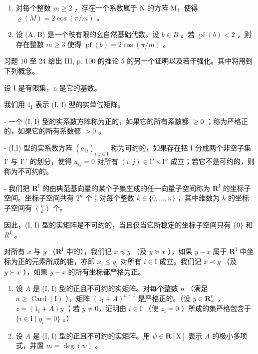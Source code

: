 \begin{enumerate}
\def\labelenumi{\alph{enumi})}
\setcounter{enumi}{1}
\item
  对每个整数 \(m \geqslant 2\) ，存在一个系数属于 N 的方阵 M，使得 \(\varrho(M) = 2 \cos(\pi/m)\) 。
\item
  设 (A, B) 是一个秩有限的幺自然基础代数。设 \(b \in B\) 。若 \(\operatorname{pf}(b) < 2\) ，则存在整数 \(m \geqslant 3\) 使得 \(\operatorname{pf}(b) = 2 \cos(\pi/m)\) 。
\end{enumerate}

习题 10 至 24 给出 III, p. 100 的推论 5 的另一个证明以及若干强化。其中将用到下列概念。

设 I 是有限集，n 是它的基数。

我们用 \(1_{\mathrm{I}}\) 表示 (I, I) 型的实单位矩阵。

- 一个 (I, I) 型的实系数方阵称为正的，如果它的所有系数都 \(\geqslant 0\) ；称为严格正的，如果它的所有系数都 \(>0\) 。

- (I,I) 型的实系数方阵 \((a_{ij})_{i,j\in \mathrm{I}}\) 称为可约的，如果存在把 I 分成两个非空子集 I' 与 I'\,' 的划分，使得 \(a_{ij} = 0\) 对所有 \((i,j)\in \mathrm{I}'\times \mathrm{I}''\) 成立；若它不是可约的，则称为不可约的。

- 我们把 \(\mathbf{R}^{\mathrm{I}}\) 的由典范基向量的某个子集生成的任一向量子空间称为 \(\mathbf{R}^{\mathrm{I}}\) 的坐标子空间。坐标子空间共有 \(2^{n}\) 个；对每个整数 \(k\in\{0,\ldots,n\}\) ，其中维数为 \(k\) 的坐标子空间有 \(\binom{n}{k}\) 个。

因此，(I, I) 型的实矩阵是不可约的，当且仅当它所稳定的坐标子空间只有 \(\{0\}\) 和 \(R^{I}\) 。

对所有 \(x\) 与 \(y\) （\(\mathbf{R}^{\mathrm{I}}\) 中的），我们记 \(x \preccurlyeq y\) （及 \(y \succcurlyeq x\) ），如果 \(y - x\) 属于 \(\mathbf{R}^{\mathrm{I}}\) 中坐标为正的元素所成的锥，亦即 \(x_i \leqslant y_i\) 对所有 \(i \in \mathrm{I}\) 成立。我们记 \(x \prec y\) （及 \(y \succ x\) ），如果 \(y - x\) 的所有坐标都严格为正。

\begin{enumerate}
\def\labelenumi{\arabic{enumi})}
\setcounter{enumi}{9}
\item
  设 \(A\) 是 (I, I) 型的正且不可约的实矩阵。对每个整数 \(n\) （满足 \(n \geqslant \operatorname{Card}(\mathrm{I})\) ），矩阵 \((1_{\mathrm{I}} + A)^{n-1}\) 是严格正的。（设 \(y \in \mathbf{R}_{+}^{n}\) ，\(z = (1_{\mathrm{I}} + A)y\) ；若 \(y \neq 0\)，证明由 \(i \in \mathrm{I}\) （使 \(z_{i} = 0\) ）所成的集严格包含于 \(\{i \in \mathrm{I} \mid y_{i} = 0\}\) 。）
\item
  设 \(A\) 是 (I, I) 型的正且不可约的实矩阵。用 \(\psi \in \mathbf{R}[\mathrm{X}]\) 表示 \(A\) 的极小多项式，并置 \(m = \deg(\psi)\) 。
\end{enumerate}

